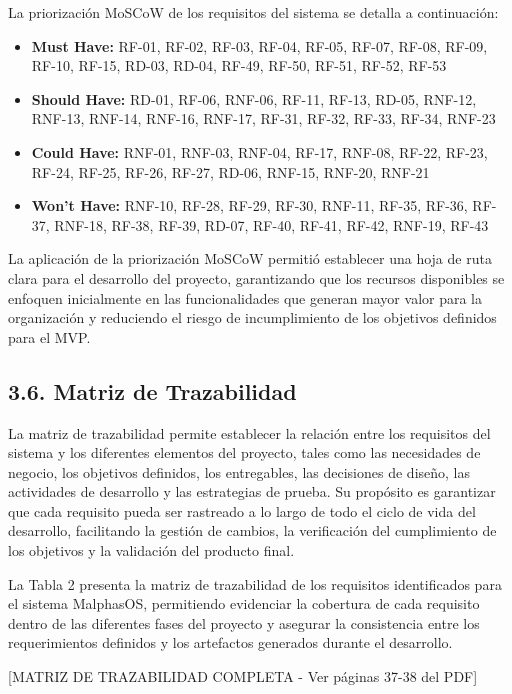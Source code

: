 \documentclass[12pt,a4paper]{article}
\newcommand{\subsectiontitle}[1]{%
  \subsection*{#1}
  \addcontentsline{toc}{subsection}{#1}
}
\begin{document}
La priorización MoSCoW de los requisitos del sistema se detalla a continuación:

\begin{itemize}
  \item \textbf{Must Have:} RF-01, RF-02, RF-03, RF-04, RF-05, RF-07, RF-08, RF-09, RF-10, RF-15, RD-03, RD-04, RF-49, RF-50, RF-51, RF-52, RF-53

  \item \textbf{Should Have:} RD-01, RF-06, RNF-06, RF-11, RF-13, RD-05, RNF-12, RNF-13, RNF-14, RNF-16, RNF-17, RF-31, RF-32, RF-33, RF-34, RNF-23

  \item \textbf{Could Have:} RNF-01, RNF-03, RNF-04, RF-17, RNF-08, RF-22, RF-23, RF-24, RF-25, RF-26, RF-27, RD-06, RNF-15, RNF-20, RNF-21

  \item \textbf{Won't Have:} RNF-10, RF-28, RF-29, RF-30, RNF-11, RF-35, RF-36, RF-37, RNF-18, RF-38, RF-39, RD-07, RF-40, RF-41, RF-42, RNF-19, RF-43
\end{itemize}

La aplicación de la priorización MoSCoW permitió establecer una hoja de ruta clara para el desarrollo del proyecto, garantizando que los recursos disponibles se enfoquen inicialmente en las funcionalidades que generan mayor valor para la organización y reduciendo el riesgo de incumplimiento de los objetivos definidos para el MVP.

\subsectiontitle{3.6. Matriz de Trazabilidad}

La matriz de trazabilidad permite establecer la relación entre los requisitos del sistema y los diferentes elementos del proyecto, tales como las necesidades de negocio, los objetivos definidos, los entregables, las decisiones de diseño, las actividades de desarrollo y las estrategias de prueba. Su propósito es garantizar que cada requisito pueda ser rastreado a lo largo de todo el ciclo de vida del desarrollo, facilitando la gestión de cambios, la verificación del cumplimiento de los objetivos y la validación del producto final.

La Tabla 2 presenta la matriz de trazabilidad de los requisitos identificados para el sistema MalphasOS, permitiendo evidenciar la cobertura de cada requisito dentro de las diferentes fases del proyecto y asegurar la consistencia entre los requerimientos definidos y los artefactos generados durante el desarrollo.

[MATRIZ DE TRAZABILIDAD COMPLETA - Ver páginas 37-38 del PDF]
\end{document}
